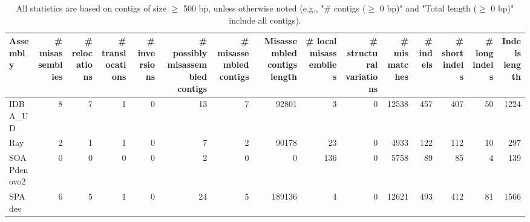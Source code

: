 \documentclass[12pt,a4paper]{article}
\begin{document}
\begin{table}[ht]
\begin{center}
\caption{All statistics are based on contigs of size $\geq$ 500 bp, unless otherwise noted (e.g., "\# contigs ($\geq$ 0 bp)" and "Total length ($\geq$ 0 bp)" include all contigs).}
\begin{tabular}{|l*{14}{|r}|}
\hline
Assembly & \# misassemblies &     \# relocations &     \# translocations &     \# inversions & \# possibly misassembled contigs & \# misassembled contigs & Misassembled contigs length & \# local misassemblies & \# structural variations & \# mismatches & \# indels &     \# short indels &     \# long indels & Indels length \\ \hline
IDBA\_UD & 8 & 7 & 1 & 0 & 13 & 7 & 92801 & 3 & 0 & 12538 & 457 & 407 & 50 & 1224 \\ \hline
Ray & 2 & 1 & 1 & 0 & 7 & 2 & 90178 & 23 & 0 & 4933 & 122 & 112 & 10 & 297 \\ \hline
SOAPdenovo2 & 0 & 0 & 0 & 0 & 2 & 0 & 0 & 136 & 0 & 5758 & 89 & 85 & 4 & 139 \\ \hline
SPAdes & 6 & 5 & 1 & 0 & 24 & 5 & 189136 & 4 & 0 & 12621 & 493 & 412 & 81 & 1566 \\ \hline
\end{tabular}
\end{center}
\end{table}
\end{document}
